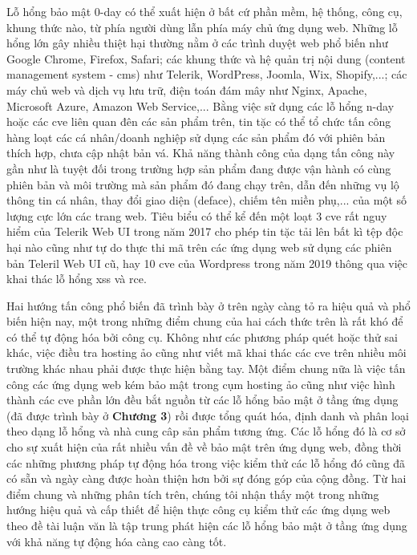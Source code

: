 Lỗ hổng bảo mật 0-day có thể xuất hiện ở bất cứ phần mềm, hệ thống, công cụ, khung thức nào, từ phía người dùng lẫn phía máy chủ ứng dụng web. Những lỗ hổng lớn gây nhiều thiệt hại thường nằm ở các trình duyệt web phổ biến như Google Chrome, Firefox, Safari; các khung thức và hệ quản trị nội dung (content management system - \acrshort{cms}) như Telerik, WordPress, Joomla, Wix, Shopify,...; các máy chủ web và dịch vụ lưu trữ, điện toán đám mây như Nginx, Apache, Microsoft Azure, Amazon Web Service,... Bằng việc sử dụng các lỗ hổng n-day hoặc các \acrshort{cve} liên quan đên các sản phẩm trên, tin tặc có thể tổ chức tấn công hàng loạt các cá nhân/doanh nghiệp sử dụng các sản phẩm đó với phiên bản thích hợp, chưa cập nhật bản vá. Khả năng thành công của dạng tấn công này gần như là tuyệt đối trong trường hợp sản phẩm đang được vận hành có cùng phiên bản và môi trường mà sản phẩm đó đang chạy trên, dẫn đến những vụ lộ thông tin cá nhân, thay đổi giao diện (deface), chiếm tên miền phụ,... của một số lượng cực lớn các trang web. Tiêu biểu có thể kể đến một loạt 3 \acrshort{cve} rất nguy hiểm của Telerik Web UI \parencite{telerik-CVEs} trong năm 2017 cho phép tin tặc tải lên bất kì tệp độc hại nào cũng như tự do thực thi mã trên các ứng dụng web sử dụng các phiên bản Teleril Web UI cũ, hay 10 \acrshort{cve} của Wordpress \parencite{wordpress-CVEs} trong năm 2019 thông qua việc khai thác lỗ hổng \acrshort{xss} và \acrshort{rce}.\par
Hai hướng tấn công phổ biến đã trình bày ở trên ngày càng tỏ ra hiệu quả và phổ biến hiện nay, một trong những điểm chung của hai cách thức trên là rất khó để có thể tự động hóa bởi công cụ. Không như các phương pháp quét hoặc thử sai khác, việc điều tra hosting ảo cũng như viết mã khai thác các \acrshort{cve} trên nhiều môi trường khác nhau phải được thực hiện bằng tay. Một điểm chung nữa là việc tấn công các ứng dụng web kém bảo mật trong cụm hosting ảo cũng như việc hình thành các \acrshort{cve} phần lớn đều bắt nguồn từ các lỗ hổng bảo mật ở tầng ứng dụng (đã được trình bày ở \textbf{Chương 3}) rồi được tổng quát hóa, định danh và phân loại theo dạng lỗ hổng và nhà cung câp sản phẩm tương ứng. Các lỗ hổng đó là cơ sở cho sự xuất hiện của rất nhiều vấn đề về bảo mật trên ứng dụng web, đồng thời các những phương pháp tự động hóa trong việc kiểm thử các lỗ hổng đó cũng đã có sẵn và ngày càng được hoàn thiện hơn bởi sự đóng góp của cộng đồng. Từ hai điểm chung và những phân tích trên, chúng tôi nhận thấy một trong những hướng hiệu quả và cấp thiết để hiện thực công cụ kiểm thử các ứng dụng web theo đề tài luận văn là tập trung phát hiện các lỗ hổng bảo mật ở tầng ứng dụng với khả năng tự động hóa càng cao càng tốt.
